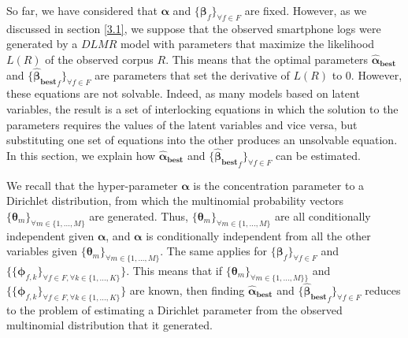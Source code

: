 So far, we have considered that $\boldsymbol{\alpha}$ and $\{\boldsymbol{\beta }_{f}\}_{\forall f\in F}$ are fixed. However, as we discussed in section \ref{3.1}, we suppose that the observed smartphone logs were generated by a $DLMR$ model with parameters that maximize the likelihood $L(R)$ of the observed corpus $R$. This means that the optimal parameters $\boldsymbol{\widehat{\alpha}_{best}}$ and $\{\boldsymbol{\widehat{\beta }_{best}}_{f}\}_{\forall f\in F}$ are parameters that set the derivative of $L(R)$ to $0$. However, these equations are not solvable. Indeed, as many models based on latent variables, the result is a set of interlocking equations in which the solution to the parameters requires the values of the latent variables and vice versa, but substituting one set of equations into the other produces an unsolvable equation. In this section, we explain how $\boldsymbol{\widehat{\alpha}_{best}}$ and $\{\boldsymbol{\widehat{\beta }_{best}}_{f}\}_{\forall f\in F}$ can be estimated. \par

We recall that the hyper-parameter $\boldsymbol{\alpha}$ is the concentration parameter to a Dirichlet distribution, from which the multinomial probability vectors $\{\boldsymbol{\theta}_{m}\}_{\forall m\in \{1,...,M\}}$ are generated. Thus, $\{\boldsymbol{\theta}_{m}\}_{\forall m\in \{1,...,M\}}$ are all conditionally independent given $\boldsymbol{\alpha}$, and $\boldsymbol{\alpha}$ is conditionally independent from all the other variables given $\{\boldsymbol{\theta}_{m}\}_{\forall m\in \{1,...,M\}}$. The same applies for $\{\boldsymbol{\beta }_{f}\}_{\forall f\in F}$ and $\{\{\boldsymbol{\phi }_{f,k}\}_{\forall f \in F, \forall k\in\{1,...,K\}}\}$. This means that if $\{\boldsymbol{\theta}_{m}\}_{\forall m\in \{1,...,M\}\}}$ and $\{\{\boldsymbol{\phi }_{f,k}\}_{\forall f \in F, \forall k\in\{1,...,K\}}\}$ are known, then finding $\boldsymbol{\widehat{\alpha}_{best}}$ and $\{\boldsymbol{\widehat{\beta }_{best}}_{f}\}_{\forall f\in F}$ reduces to the problem of estimating a Dirichlet parameter from the observed multinomial distribution that it generated. \par

